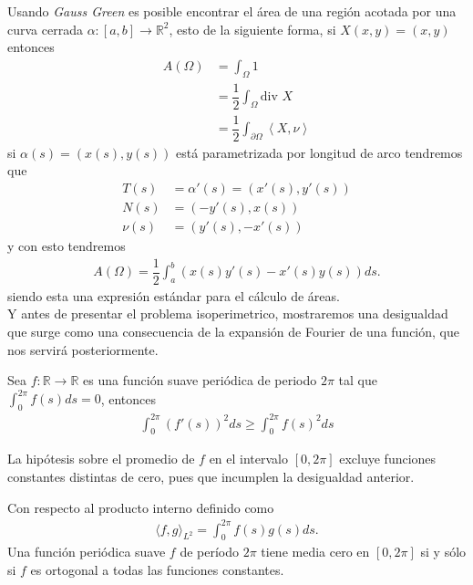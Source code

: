 \documentclass[oneside,11pt]{memoir}
\begin{document}
Usando \textit{Gauss Green} es posible encontrar el área de una región acotada por una curva cerrada $\alpha:[a,b]\to \mathbb{R}^2$, esto de la siguiente forma, si $X(x,y)=(x,y)$ entonces
\begin{align*}
    A(\Omega)&=\int_{\Omega}1\\
            &=\dfrac{1}{2}\int_{\Omega}\text{div }X\\
            &=\dfrac{1}{2}\int_{\partial\Omega}\left\langle X,\nu\right\rangle 
\end{align*}
si $\alpha(s)=(x(s),y(s))$ está parametrizada por longitud de arco tendremos que
\begin{align*}
    T(s)&=\alpha'(s)=(x'(s),y'(s))\\
    N(s)&=(-y'(s),x(s))\\
    \nu(s)&=(y'(s),-x'(s))
\end{align*}
y con esto tendremos 
\begin{align*}
    A(\Omega)=\dfrac{1}{2}\int_{a}^b(x(s)y'(s)-x'(s)y(s))ds.
\end{align*}
siendo esta una expresión estándar para el cálculo de áreas.\\

Y antes de presentar el problema isoperimetrico, mostraremos una desigualdad que surge como una consecuencia de la expansión de Fourier de una función, que nos servirá posteriormente.
\begin{lemma}
   Sea $f:\mathbb{R}\to\mathbb{R}$ es una función suave periódica de periodo $2\pi$ tal que $\int_{0}^{2\pi}f(s)ds=0$, entonces
   \begin{align*}
       \int_{0}^{2\pi}(f'(s))^2ds\geq \int _0^{2\pi}f(s)^2ds
   \end{align*}
\end{lemma}
 La hipótesis sobre el promedio de $f$ en el intervalo $[0,2\pi]$ excluye funciones constantes distintas de cero, pues que incumplen la desigualdad anterior. 
   
Con respecto al producto interno definido como
\begin{align*}
    \langle f,g\rangle_{L^2}=\int_{0}^{2\pi}f(s)g(s)ds .
\end{align*}
Una función periódica suave $f$ de período $2\pi$ tiene media cero en $[0,2\pi]$ si y sólo si $f$ es ortogonal a todas las funciones constantes.
\end{document}

